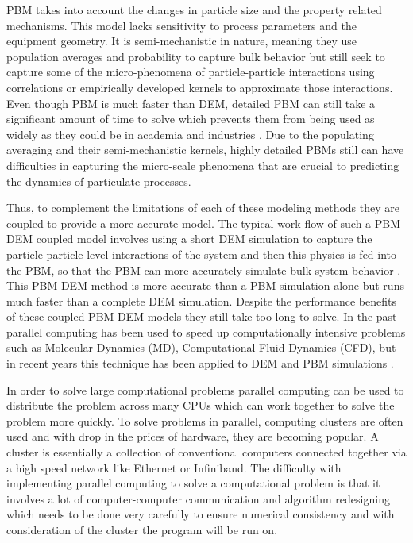 \documentclass[preprint,11pt,authoryear]{elsarticle}
\begin{document}
PBM takes into account the changes in particle size and the property related mechanisms. This 
model lacks sensitivity to process parameters and the equipment geometry. It is semi-mechanistic in 
nature, meaning they use population averages and probability to capture bulk behavior but still 
seek to capture some of the micro-phenomena of particle-particle interactions using correlations or 
empirically developed kernels to approximate those interactions. Even though PBM is much faster 
than DEM, detailed PBM can still take a significant amount of time to solve which prevents them 
from being used as widely as they could be in academia and industries \citep{Barrasso2013}. Due to the 
populating averaging and their semi-mechanistic kernels, highly detailed PBMs still can have 
difficulties in capturing the micro-scale phenomena that are crucial to predicting the dynamics of 
particulate processes. 

Thus, to complement the limitations of each of these modeling methods they are coupled to 
provide a more accurate model.  The typical work flow of such a PBM-DEM coupled model involves 
using a short DEM simulation to capture the particle-particle level interactions of the system and 
then this physics is fed into the PBM, so that the PBM can more accurately simulate bulk system 
behavior \citep{Goldschmidt2003} \citep{Reinhold2012}\citep{Barrasso2013}. This PBM-DEM 
method is more accurate than a PBM simulation alone but runs much faster than a complete DEM 
simulation. Despite the performance benefits of these coupled PBM-DEM models they still take too 
long to solve. In the past parallel computing has been used to speed up computationally intensive 
problems such as Molecular Dynamics (MD), Computational Fluid Dynamics (CFD), but in recent 
years  this technique has been applied to DEM and PBM simulations 
\citep{Bettencourt2017}\citep{Prakash2013a}\citep{Gunawan2008}.

In order to solve large computational problems parallel computing can be used to distribute the 
problem across many CPUs which can work together to solve the problem more quickly. To solve 
problems in parallel, computing clusters are often used and with drop  in the prices of hardware, 
they are becoming popular. A cluster is essentially a collection of conventional computers 
connected together via a high speed network like Ethernet or Infiniband. The difficulty with 
implementing parallel computing to solve a computational problem is that it involves a lot of 
computer-computer communication and algorithm redesigning which needs to be done very 
carefully to ensure numerical consistency and with consideration of the cluster the program will be 
run on.
\end{document}
